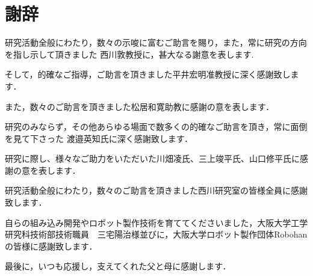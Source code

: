 
\chapter*{謝辞}
研究活動全般にわたり，数々の示唆に富むご助言を賜り，また，常に研究の方向を指し示して頂きました
西川敦教授に，甚大なる謝意を表します.

そして，的確なご指導，ご助言を頂きました平井宏明准教授に深く感謝致します．

また，数々のご助言を頂きました松居和寛助教に感謝の意を表します．

研究のみならず，その他あらゆる場面で数多くの的確なご助言を頂き，常に面倒を見て下さった
渡邉英知氏に深く感謝致します．

研究に際し、様々なご助力をいただいた川畑凌氏、三上竣平氏、山口修平氏に感謝の意を表します．

研究活動全般にわたり，数々のご助言を頂きました西川研究室の皆様全員に感謝致します．

自らの組み込み開発やロボット製作技術を育ててくださいました，大阪大学工学研究科技術部技術職員　三宅陽治様並びに，大阪大学ロボット製作団体Robohanの皆様に感謝致します．

最後に，いつも応援し，支えてくれた父と母に感謝します．
